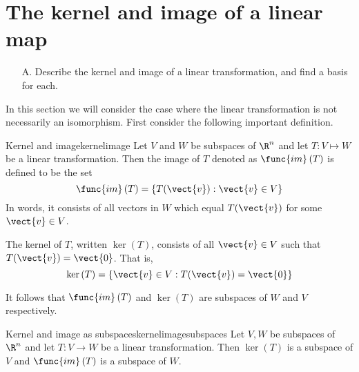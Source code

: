 \section{The kernel and image of a linear map}

\begin{outcome}
\begin{enumerate}
\item[A.]  Describe the kernel and image of a linear transformation, and find a basis for each. 
\end{enumerate}
\end{outcome}

In this section we will consider the case where the linear transformation is not necessarily an
isomorphism. First consider the following important definition.

\begin{definition}{Kernel and image}{kernelimage}
Let $V$ and $W$ be subspaces of $\R^n$ and let $T:V\mapsto W$ be a linear transformation. Then the image of $T$
denoted as $\func{im}\left( T\right) $ is defined to be the set 
\begin{equation*}
\func{im}\left( T\right) = \left\{T (\vect{v}):\vect{v}\in V\right\}
\end{equation*}
In words, it consists of all vectors in $W$ which equal $T(\vect{v})$ for some $
\vect{v}\in V$.

The kernel of $T$, written $\ker \left( T\right) $, consists of all $\vect{v}\in V$ such that $T(\vect{v})=\vect{0}$. That is, 
\begin{equation*}
\ker \left( T\right) =\left\{ \vect{v}\in V:T(\vect{v})=\vect{0}\right\}
\end{equation*}
\end{definition}

It follows that $\func{im}\left( T\right) $ and $\ker \left( T\right) $
are subspaces of $W$ and $V$ respectively.

\begin{proposition}{Kernel and image as subspaces}{kernelimagesubspaces}
Let $V, W$ be subspaces of $\R^n$ and let $T:V\rightarrow W$ be a linear transformation. Then $\ker \left(
T\right) $ is a subspace of $V$ and $\func{im}\left( T\right) $ is a
subspace of $W$.
\end{proposition}

